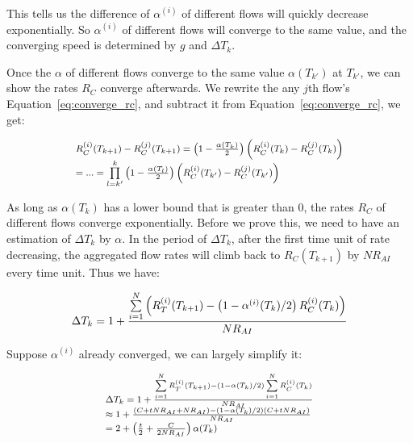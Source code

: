 This tells us the difference of $\alpha^{(i)}$ of different flows will quickly decrease exponentially. So $\alpha^{(i)}$
of different flows will converge to the same value, and the converging speed is determined by $g$ and
$\Delta T_k$. 

Once the $\alpha$ of different flows converge to the same value $\alpha(T_{k'})$ at $T_{k'}$, we can show 
the rates $R_C$ converge afterwards. We rewrite the any $j$th flow's Equation~\ref{eq:converge_rc}, and subtract it 
from Equation~\ref{eq:converge_rc}, we get:

\begin{equation}
\small
\begin{array}{l}
R_C^{(i)}({T_{k + 1}}) - R_C^{(j)}({T_{k + 1}}) = \left( {1 - \frac{{\alpha ({T_k})}}{2}} \right)\left( {R_C^{(i)}({T_k}) - R_C^{(j)}({T_k})} \right)\\
 = ... = \prod\limits_{l = k'}^k {\left( {1 - \frac{{\alpha ({T_l})}}{2}} \right)} \left( {R_C^{(i)}({T_{k'}}) - R_C^{(j)}({T_{k'}})} \right)
\end{array}
\end{equation}

As long as $\alpha ({T_k})$ has a lower bound that is greater than 0, the rates $R_C$ of different flows 
converge exponentially. Before we prove this, we need to have an estimation of $\Delta T_k$ by $\alpha$.
In the period of $\Delta T_k$, after the first time unit of rate decreasing, the aggregated flow rates
will climb back to $R_C(T_{k+1})$ by $NR_{AI}$ every time unit. Thus we have:

\begin{equation}
\small\Delta {T_k} = 1 + \frac{{\sum\limits_{i = 1}^N {\left( {R_T^{(i)}({T_{k + 1}}) - \left( {1 - {\alpha ^{(i)}}({T_k})/2} \right)R_C^{(i)}({T_k})} \right)} }}{{N{R_{AI}}}}
\end{equation}

Suppose $\alpha^{(i)}$ already converged, we can largely simplify it:

\begin{equation}
\small
\begin{array}{l}
\Delta {T_k} = 1 + \frac{{\sum\limits_{i = 1}^N {R_T^{(i)}({T_{k + 1}})}  - \left( {1 - \alpha ({T_k})/2} \right)\sum\limits_{i = 1}^N {R_C^{(i)}({T_k})} }}{{N{R_{AI}}}}\\
 \approx 1 + \frac{{\left( {C + tN{R_{AI}} + N{R_{AI}}} \right) - \left( {1 - \alpha ({T_k})/2} \right)\left( {C + tN{R_{AI}}} \right)}}{{N{R_{AI}}}}\\
 = 2 + \left( {\frac{t}{2} + \frac{C}{{2N{R_{AI}}}}} \right)\alpha ({T_k})
\end{array}
\label{eq:converge_tk}
\end{equation}

